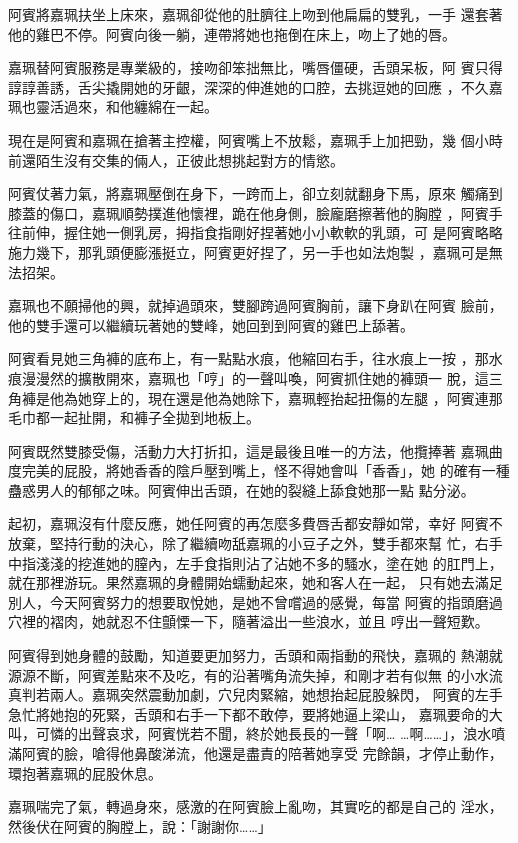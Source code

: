 阿賓將嘉珮扶坐上床來，嘉珮卻從他的肚臍往上吻到他扁扁的雙乳，一手
還套著他的雞巴不停。阿賓向後一躺，連帶將她也拖倒在床上，吻上了她的唇。

嘉珮替阿賓服務是專業級的，接吻卻笨拙無比，嘴唇僵硬，舌頭呆板，阿
賓只得諄諄善誘，舌尖撬開她的牙齦，深深的伸進她的口腔，去挑逗她的回應
，不久嘉珮也靈活過來，和他纏綿在一起。

現在是阿賓和嘉珮在搶著主控權，阿賓嘴上不放鬆，嘉珮手上加把勁，幾
個小時前還陌生沒有交集的倆人，正彼此想挑起對方的情慾。

阿賓仗著力氣，將嘉珮壓倒在身下，一跨而上，卻立刻就翻身下馬，原來
觸痛到膝蓋的傷口，嘉珮順勢撲進他懷裡，跪在他身側，臉龐磨擦著他的胸膛
，阿賓手往前伸，握住她一側乳房，拇指食指剛好捏著她小小軟軟的乳頭，可
是阿賓略略施力幾下，那乳頭便膨漲挺立，阿賓更好捏了，另一手也如法炮製
，嘉珮可是無法招架。

嘉珮也不願掃他的興，就掉過頭來，雙腳跨過阿賓胸前，讓下身趴在阿賓
臉前，他的雙手還可以繼續玩著她的雙峰，她回到到阿賓的雞巴上舔著。

阿賓看見她三角褲的底布上，有一點點水痕，他縮回右手，往水痕上一按
，那水痕漫漫然的擴散開來，嘉珮也「哼」的一聲叫喚，阿賓抓住她的褲頭一
脫，這三角褲是他為她穿上的，現在還是他為她除下，嘉珮輕抬起扭傷的左腿
，阿賓連那毛巾都一起扯開，和褲子全拋到地板上。

阿賓既然雙膝受傷，活動力大打折扣，這是最後且唯一的方法，他攬捧著
嘉珮曲度完美的屁股，將她香香的陰戶壓到嘴上，怪不得她會叫「香香」，她
的確有一種蠱惑男人的郁郁之味。阿賓伸出舌頭，在她的裂縫上舔食她那一點
點分泌。

起初，嘉珮沒有什麼反應，她任阿賓的再怎麼多費唇舌都安靜如常，幸好
阿賓不放棄，堅持行動的決心，除了繼續吻舐嘉珮的小豆子之外，雙手都來幫
忙，右手中指淺淺的挖進她的膣內，左手食指則沾了沾她不多的騷水，塗在她
的肛門上，就在那裡游玩。果然嘉珮的身體開始蠕動起來，她和客人在一起，
只有她去滿足別人，今天阿賓努力的想要取悅她，是她不曾嚐過的感覺，每當
阿賓的指頭磨過穴裡的褶肉，她就忍不住顫慄一下，隨著溢出一些浪水，並且
哼出一聲短歎。

阿賓得到她身體的鼓勵，知道要更加努力，舌頭和兩指動的飛快，嘉珮的
熱潮就源源不斷，阿賓差點來不及吃，有的沿著嘴角流失掉，和剛才若有似無
的小水流真判若兩人。嘉珮突然震動加劇，穴兒肉緊縮，她想抬起屁股躲閃，
阿賓的左手急忙將她抱的死緊，舌頭和右手一下都不敢停，要將她逼上梁山，
嘉珮要命的大叫，可憐的出聲哀求，阿賓恍若不聞，終於她長長的一聲「啊…
…啊……」，浪水噴滿阿賓的臉，嗆得他鼻酸涕流，他還是盡責的陪著她享受
完餘韻，才停止動作，環抱著嘉珮的屁股休息。

嘉珮喘完了氣，轉過身來，感激的在阿賓臉上亂吻，其實吃的都是自己的
淫水，然後伏在阿賓的胸膛上，說：「謝謝你……」

